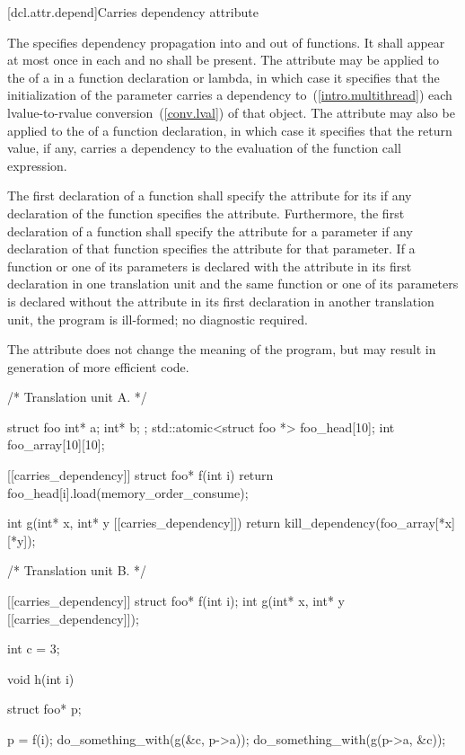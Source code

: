 [dcl.attr.depend]{Carries dependency attribute}%

\pnum
The   specifies
dependency propagation into and out of functions. It shall appear at most once
in each  and no
 shall be present. The attribute may be
applied to the  of a
 in a function declaration or lambda, in
which case it specifies that the initialization of the parameter carries a
dependency to~(\ref{intro.multithread}) each lvalue-to-rvalue
conversion~(\ref{conv.lval}) of that object. The attribute may also be applied
to the  of a function declaration, in which case it
specifies that the return value, if any, carries a dependency to the evaluation
of the function call expression.

\pnum
The first declaration of a function shall specify the  attribute for its
 if any declaration of the function specifies the
 attribute. Furthermore, the first declaration of a function shall specify
the  attribute for a parameter if any declaration of that function
specifies the  attribute for that parameter. If a function or one of its
parameters is declared with the  attribute in its first declaration in one
translation unit and the same function or one of its parameters is declared without the
 attribute in its first declaration in another translation unit, the
program is ill-formed; no diagnostic required.

\pnum
\enternote The  attribute does not change the meaning of the
program, but may result in generation of more efficient code. \exitnote

\pnum
\enterexample
\begin{codeblock}
/* Translation unit A. */

struct foo { int* a; int* b; };
std::atomic<struct foo *> foo_head[10];
int foo_array[10][10];

[[carries_dependency]] struct foo* f(int i) {
  return foo_head[i].load(memory_order_consume);
}

int g(int* x, int* y [[carries_dependency]]) {
  return kill_dependency(foo_array[*x][*y]);
}

/* Translation unit B. */

[[carries_dependency]] struct foo* f(int i);
int g(int* x, int* y [[carries_dependency]]);

int c = 3;

void h(int i) {
  struct foo* p;

  p = f(i);
  do_something_with(g(&c, p->a));
  do_something_with(g(p->a, &c));
}
\end{codeblock}


